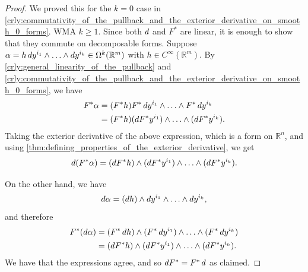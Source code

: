 \documentclass[notoc,notitlepage]{tufte-book}
\begin{document}
\begin{proof}
  We proved this for the $k = 0 $ case in
  \cref{crly:commutativity_of_the_pullback_and_the_exterior_derivative_on_smooth_0_forms}.
  WMA $k \geq 1$. Since both $\mathop{}\!d{}$ and $F^*$ are linear, it is enough to show that they
  commute on decomposable forms. Suppose $\alpha = h \mathop{}\!d{y^{i_1}} \land \hdots \land \mathop{}\!d{y^{i_k}} \in
  \Omega^k(\mathbb{R}^m)$ with $h \in C^{\infty}(\mathbb{R}^m)$. By
  \cref{crly:general_linearity_of_the_pullback} and
  \cref{crly:commutativity_of_the_pullback_and_the_exterior_derivative_on_smooth_0_forms},
  we have
  \begin{align*}
    F^* \alpha &= (F^* h) F^* \mathop{}\!d{y^{i_1}} \land \hdots \land F^* \mathop{}\!d{y^{i_k}} \\
               &= (F^* h) (\mathop{}\!d{F^* y^{i_1}}) \land \hdots \land (\mathop{}\!d{F^* y^{i_k}}).
  \end{align*}
  Taking the exterior derivative of the above expression, which is a form on
  $\mathbb{R}^n$, and using \cref{thm:defining_properties_of_the_exterior_derivative}, we
  get
  \begin{equation*}
    \mathop{}\!d{(F^* \alpha)} = (\mathop{}\!d{F^* h}) \land (\mathop{}\!d{F^* y^{i_1}}) \land \hdots \land
    (\mathop{}\!d{F^* y^{i_k}}).
  \end{equation*}

  On the other hand, we have
  \begin{equation*}
    \mathop{}\!d{\alpha} = (\mathop{}\!d{h}) \land \mathop{}\!d{y^{i_1}} \land \hdots \land \mathop{}\!d{y^{i_k}},
  \end{equation*}
  and therefore
  \begin{align*}
    F^* ( \mathop{}\!d{\alpha} ) &= (F^* \mathop{}\!d{h}) \land (F^* \mathop{}\!d{y^{i_1}}) \land \hdots \land
                          (F^* \mathop{}\!d{y^{i_k}}) \\
                         &= (\mathop{}\!d{F^* h}) \land (\mathop{}\!d{F^* y^{i_1}}) \land \hdots \land
                          (\mathop{}\!d{F^* y^{i_k}}).
  \end{align*}
  We have that the expressions agree, and so $\mathop{}\!d{F^*} = F^* \mathop{}\!d{}$ as claimed.
\end{proof}




\label{part:submanifolds_of_r_n_}
\end{document}
